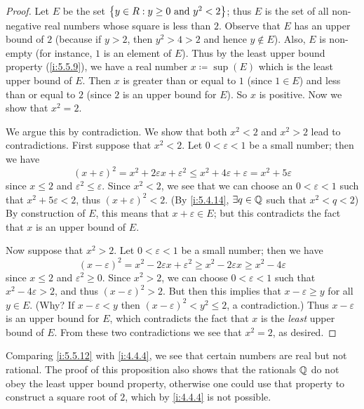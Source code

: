 \begin{proof}
  Let \(E\) be the set \(\left\lbrace y \in R : y \geq 0 \text{ and } y^2 < 2\right\rbrace\);
  thus \(E\) is the set of all non-negative real numbers whose square is less than \(2\).
  Observe that \(E\) has an upper bound of \(2\) (because if \(y > 2\), then \(y^2 > 4 > 2\) and hence \(y \notin E\)).
  Also, \(E\) is non-empty (for instance, \(1\) is an element of \(E\)).
  Thus by the least upper bound property (\cref{i:5.5.9}), we have a real number \(x \coloneqq \sup(E)\) which is the least upper bound of \(E\).
  Then \(x\) is greater than or equal to \(1\) (since \(1 \in E\)) and less than or equal to \(2\)
  (since \(2\) is an upper bound for \(E\)).
  So \(x\) is positive.
  Now we show that \(x^2 = 2\).

  We argue this by contradiction.
  We show that both \(x^2 < 2\) and \(x^2 > 2\) lead to contradictions.
  First suppose that \(x^2 < 2\).
  Let \(0 < \varepsilon < 1\) be a small number;
  then we have
  \[
    (x + \varepsilon)^2 = x^2 + 2\varepsilon x + \varepsilon^2 \leq x^2 + 4\varepsilon + \varepsilon = x^2 + 5\varepsilon
  \]
  since \(x \leq 2\) and \(\varepsilon^2 \leq \varepsilon\).
  Since \(x^2 < 2\), we see that we can choose an \(0 < \varepsilon < 1\) such that \(x^2 + 5\varepsilon < 2\), thus \((x + \varepsilon)^2 < 2\).
  (By \cref{i:5.4.14}, \(\exists q \in \mathbb{Q}\) such that \(x^2 < q < 2\))
  By construction of \(E\), this means that \(x + \varepsilon \in E\);
  but this contradicts the fact that \(x\) is an upper bound of \(E\).

  Now suppose that \(x^2 > 2\).
  Let \(0 < \varepsilon < 1\) be a small number;
  then we have
  \[
    (x - \varepsilon)^2 = x^2 - 2\varepsilon x + \varepsilon^2 \geq x^2 - 2\varepsilon x \geq x^2 - 4\varepsilon
  \]
  since \(x \leq 2\) and \(\varepsilon^2 \geq 0\).
  Since \(x^2 > 2\), we can choose \(0 < \varepsilon < 1\) such that \(x^2 - 4\varepsilon > 2\), and thus \((x - \varepsilon)^2 > 2\).
  But then this implies that \(x - \varepsilon \geq y\) for all \(y \in E\).
  (Why? If \(x - \varepsilon < y\) then \((x - \varepsilon)^2 < y^2 \leq 2\), a contradiction.)
  Thus \(x - \varepsilon\) is an upper bound for \(E\), which contradicts the fact that \(x\) is the \emph{least} upper bound of \(E\).
  From these two contradictions we see that \(x^2 = 2\), as desired.
\end{proof}

\begin{rmk}\label{i:5.5.13}
  Comparing \cref{i:5.5.12} with \cref{i:4.4.4}, we see that certain numbers are real but not rational.
  The proof of this proposition also shows that the rationals \(\mathbb{Q}\) do not obey the least upper bound property, otherwise one could use that property to construct a square root of \(2\), which by \cref{i:4.4.4} is not possible.
\end{rmk}

